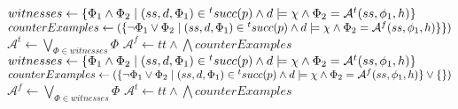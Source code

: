 \begin{algorithmic}
		\State {}
		\State {}
		\State {}
		\Repeat
			\Repeat
					\State {}
				\EndWhile
				\State {}
			\State {}
	\EndFunction
	
				\State $witnesses \gets \{ \Phi_1 \land \Phi_2 \mid (ss, d, \Phi_1) \in {}^{t}succ(p) \land d \models \chi \land \Phi_2 = \mathcal{A}^t(ss, \phi_1, h) \}$
				\State $counterExamples \gets (\{ \neg\Phi_1 \lor \Phi_2 \mid (ss, d, \Phi_1) \in {}^{t}succ(p) \land d \models \chi \land \Phi_2 = \mathcal{A}^f(ss, \phi_1, h)  \}  \}) $
				\State $\mathcal{A}^t \gets \bigvee_{\Phi \in witnesses} \Phi$
				\State $\mathcal{A}^f \gets tt \land \bigwedge counterExamples$
			\EndFor
		\EndFor
				\State $witnesses \gets \{ \Phi_1 \land \Phi_2 \mid (ss, d, \Phi_1) \in {}^{t}succ(p) \land d \models \chi \land \Phi_2 = \mathcal{A}^t(ss, \phi_1, h) \}$
				\State $counterExamples \gets (\{ \neg\Phi_1 \lor \Phi_2 \mid (ss, d, \Phi_1) \in {}^{t}succ(p) \land d \models \chi \land \Phi_2 = \mathcal{A}^f(ss, \phi_1, h)  \} \lor \{  \}) $
				\State $\mathcal{A}^f \gets \bigvee_{\Phi \in witnesses} \Phi$
				\State $\mathcal{A}^t \gets tt \land \bigwedge counterExamples$
			\EndFor			
		\EndFor		
	\EndFunction
	
\end{algorithmic}